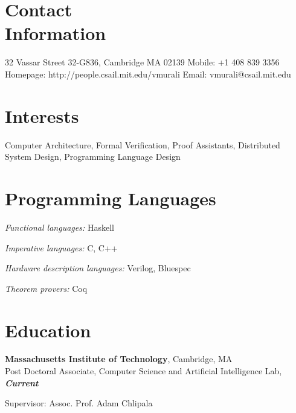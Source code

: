 \documentclass[margin,line]{resume}
\begin{document}
\begin{resume}

    \section{\mysidestyle Contact\\Information}

    32 Vassar Street 32-G836, Cambridge MA 02139   \hfill Mobile: +1 408 839 3356          \\
    Homepage: http://people.csail.mit.edu/vmurali     \hfill Email: vmurali@csail.mit.edu    \\

    \vspace{-7mm}
    \section{\mysidestyle Interests}

    Computer Architecture, Formal Verification, Proof Assistants, Distributed System Design, Programming Language Design\\

    \vspace{-5mm}

    \section{\mysidestyle Programming Languages}
    \begin{list2}
    \item \emph{Functional languages:} Haskell
    \item \emph{Imperative languages:} C, C++
    \item \emph{Hardware description languages:} Verilog, Bluespec
    \item \emph{Theorem provers:} Coq
    \end{list2}

    \section{\mysidestyle Education}
    \textbf{Massachusetts Institute of Technology}, Cambridge, MA \\
    \vspace{-2mm}
    Post Doctoral Associate, Computer Science and Artificial Intelligence Lab, \hfill \textbf{\textit{Current}}\\
    \vspace{-2mm}
    \begin{list2}
        \item Supervisor:  Assoc. Prof. Adam Chlipala
    \end{list2}\vspace{-3mm}



\end{resume}
\end{document}
